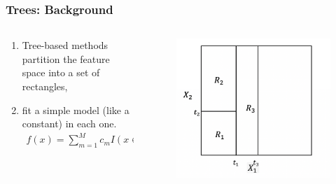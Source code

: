 \documentclass[
  shownotes,
  xcolor={svgnames},
  hyperref={colorlinks,citecolor=DarkBlue,linkcolor=DarkRed,urlcolor=DarkBlue}
  , aspectratio=169]{beamer}
\begin{document}
\begin{frame}[fragile]
\frametitle{Trees: Background}


\begin{columns}[T] %
\begin{column}{.42\textwidth}
  
\begin{enumerate}
\item Tree-based methods partition the feature space into a set of rectangles,
\item  fit a simple model (like a constant) in each one. 
\begin{align}
f(x) = \sum_{m=1}^M c_m I(x\in R_m)
\end{align}
\end{enumerate}


\end{column}  
\hfill
\begin{column}{.48\textwidth}

 \begin{figure}[H] \centering
            \captionsetup{justification=centering}
              \includegraphics[scale=0.4]{figures/cart_4}                           
 \end{figure}

\end{column}
\end{columns}
\end{frame}
\end{document}
